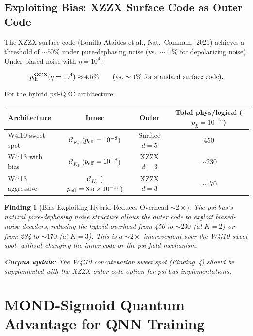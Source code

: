 \documentclass[11pt]{article}
\newtheorem{finding}[theorem]{Finding}
\theoremstyle{definition}
\theoremstyle{remark}
\newcommand{\CK}{\mathcal{C}_K}
\newcommand{\ee}[1]{\times 10^{#1}}
\begin{document}
\subsection{Exploiting Bias: XZZX Surface Code as Outer Code}
\label{sec:xzzx}

The XZZX surface code (Bonilla Ataides et al., Nat.\ Commun.\ 2021)
achieves a threshold of $\sim 50\%$ under pure-dephasing noise (vs.\
$\sim 11\%$ for depolarizing noise).  Under biased noise with
$\eta = 10^4$:

\begin{equation}
  p_{\rm th}^{\rm XZZX}(\eta = 10^4) \approx 4.5\%
  \qquad \text{(vs.\ $\sim 1\%$ for standard surface code)}.
\end{equation}

For the hybrid psi-QEC architecture:
\begin{center}
\begin{tabular}{@{}lccc@{}}
\toprule
Architecture & Inner & Outer & Total phys/logical ($p_L = 10^{-15}$) \\
\midrule
W4i10 sweet spot & $\CK_2$ ($p_{\rm eff} = 10^{-8}$) & Surface $d=5$ & 450 \\
W4i13 with bias & $\CK_2$ ($p_{\rm eff} = 10^{-8}$) & XZZX $d=3$ & \textbf{$\sim 230$} \\
W4i13 aggressive & $\CK_3$ ($p_{\rm eff} = 3.5\ee{-11}$) & XZZX $d=3$ & \textbf{$\sim 170$} \\
\bottomrule
\end{tabular}
\end{center}

\begin{finding}[Bias-Exploiting Hybrid Reduces Overhead $\sim 2\times$]
\label{finding:bias-hybrid}
The psi-bus's natural pure-dephasing noise structure allows the outer
code to exploit biased-noise decoders, reducing the hybrid overhead
from 450 to $\sim 230$ (at $K=2$) or from 234 to $\sim 170$ (at $K=3$).
This is a $\sim 2\times$ improvement over the W4i10 sweet spot, without
changing the inner code or the psi-field mechanism.

\textbf{Corpus update}: The W4i10 concatenation sweet spot (Finding~4)
should be supplemented with the XZZX outer code option for psi-bus
implementations.
\end{finding}

\section{MOND-Sigmoid Quantum Advantage for QNN Training}
\label{sec:mond-sigmoid-qnn}
\end{document}
